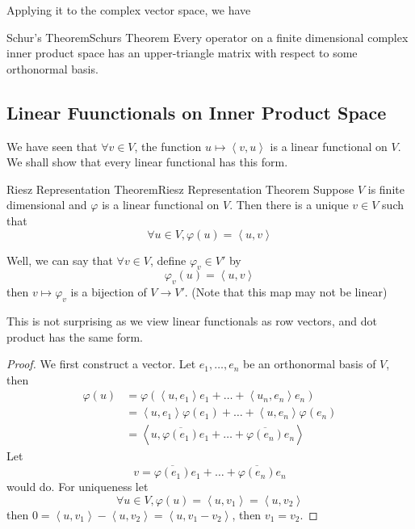 \documentclass[../main.tex]{subfiles}
\begin{document}
Applying it to the complex vector space, we have
\begin{theorem}{Schur's Theorem}{Schurs Theorem}
Every operator on a finite dimensional complex inner product space has an upper-triangle matrix with respect to some orthonormal basis.
\end{theorem}

\subsection{Linear Fuunctionals on Inner Product Space}
We have seen that $\forall v\in V$, the function $u \mapsto \left<v,u\right>$ is a linear functional on $V$. We shall show that every linear functional has this form.

\begin{theorem}{Riesz Representation Theorem}{Riesz Representation Theorem}
Suppose $V$ is finite dimensional and $\varphi$ is a linear functional on $V$. Then there is a unique $v\in V$ such that
\begin{equation*}
\forall u\in V,\varphi(u) = \left<u,v\right>
\end{equation*}

Well, we can say that $\forall v\in V$, define $\varphi_v\in V'$ by
\begin{equation*}
\varphi_v(u) = \left<u,v\right>
\end{equation*}
then $v \mapsto \varphi_v$ is a bijection of $V \rightarrow  V'$. (Note that this map may not be linear)
\end{theorem}
This is not surprising as we view linear functionals as row vectors, and dot product has the same form.
\begin{proof}
We first construct a vector. Let $e_1, \ldots ,e_n$ be an orthonormal basis of $V$, then
\begin{equation*}
\begin{aligned}
	\varphi(u) &= \varphi \left(\left<u,e_1\right>e_1+\ldots +\left<u_n,e_n\right> e_n \right)\\
	&= \left<u,e_1\right> \varphi(e_1)+\ldots +\left<u,e_n\right> \varphi(e_n)\\
	&=\left<u,\overline{\varphi(e_1)}e_1 +\ldots + \overline{\varphi(e_n)}e_n\right> 
\end{aligned}
\end{equation*}
Let
\begin{equation}
v = \overline{\varphi(e_1)}e_1 +\ldots + \overline{\varphi(e_n)}e_n
\end{equation}
would do. For uniqueness let
\begin{equation*}
\forall u\in V, \varphi(u) = \left<u,v_1\right> = \left<u,v_2\right> 
\end{equation*}
then $0 = \left<u,v_1\right> -\left<u,v_2\right> = \left<u,v_1-v_2\right> $, then $v_1=v_2$.
\end{proof}
\end{document}
